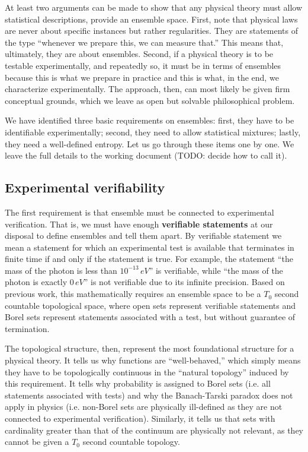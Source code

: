 \documentclass[10pt,twocolumn, nofootinbib]{revtex4-2}
\begin{document}
At least two arguments can be made to show that any physical theory must allow statistical descriptions, provide an ensemble space. First, note that physical laws are never about specific instances but rather regularities. They are statements of the type ``whenever we prepare this, we can measure that.'' This means that, ultimately, they are about ensembles. Second, if a physical theory is to be testable experimentally, and repeatedly so, it must be in terms of ensembles because this is what we prepare in practice and this is what, in the end, we characterize experimentally. The approach, then, can most likely be given firm conceptual grounds, which we leave as open but solvable philosophical problem.

We have identified three basic requirements on ensembles: first, they have to be identifiable experimentally; second, they need to allow statistical mixtures; lastly, they need a well-defined entropy. Let us go through these items one by one. We leave the full details to the working document (TODO: decide how to call it).

\subsection{Experimental verifiability}
The first requirement is that ensemble must be connected to experimental verification. That is, we must have enough \textbf{verifiable statements} at our disposal to define ensembles and tell them apart. By verifiable statement we mean a statement for which an experimental test is available that terminates in finite time if and only if the statement is true. For example, the statement ``the mass of the photon is less than $10^{-13} \, eV$'' is verifiable, while ``the mass of the photon is exactly $0 \, eV$'' is not verifiable due to its infinite precision. Based on previous work, this mathematically requires an ensemble space to be a $T_0$ second countable topological space, where open sets represent verifiable statements and Borel sets represent statements associated with a test, but without guarantee of termination.

The topological structure, then, represent the most foundational structure for a physical theory. It tells us why functions are ``well-behaved,'' which simply means they have to be topologically continuous in the ``natural topology'' induced by this requirement. It tells why probability is assigned to Borel sets (i.e. all statements associated with tests) and why the Banach-Tarski paradox does not apply in physics (i.e. non-Borel sets are physically ill-defined as they are not connected to experimental verification). Similarly, it tells us that sets with cardinality greater than that of the continuum are physically not relevant, as they cannot be given a $T_0$ second countable topology.
\end{document}
